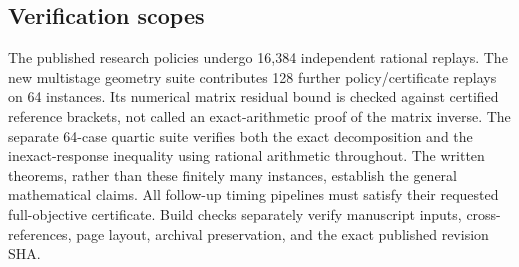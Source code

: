 \subsection{Verification scopes}
The published research policies undergo 16,384 independent rational replays. The new multistage geometry suite contributes 128 further policy/certificate replays on 64 instances. Its numerical matrix residual bound is checked against certified reference brackets, not called an exact-arithmetic proof of the matrix inverse. The separate 64-case quartic suite verifies both the exact decomposition and the inexact-response inequality using rational arithmetic throughout. The written theorems, rather than these finitely many instances, establish the general mathematical claims. All follow-up timing pipelines must satisfy their requested full-objective certificate. Build checks separately verify manuscript inputs, cross-references, page layout, archival preservation, and the exact published revision SHA.
